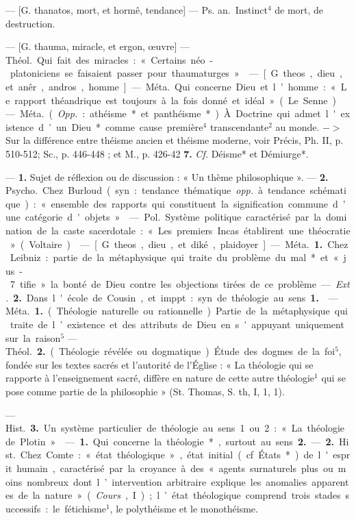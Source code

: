 \begin{itemize}[leftmargin=1cm, label=, itemsep=1pt]
 — [G. thanatos, mort, et
hormê, tendance] — \si{Ps. an.} Instinct$^4$
de mort, de destruction.

 — [G. thauma, miracle, et
ergon, œuvre] — \si{Théol.} Qui fait
des miracles : « Certains néo-platoniciens se faisaient passer pour
thaumaturges. »

 — [G. theos, dieu, et anêr,
andros, homme] — \si{Méta.} Qui concerne Dieu et l’homme : « Le rapport
théandrique est toujours à la fois
donné et idéal » (Le Senne).

 — \si{Méta.} ({\it Opp.} : athéisme* et
panthéisme*). À. Doctrine qui admet
l'existence d’un Dieu* comme cause
première$^4$ transcendante$^2$ au monde.
$->$ Sur la différence entre théisme
ancien et théisme moderne, voir
Précis, Ph. II, p. 510-512; Sc.,
p. 446-448 ; et M., p. 426-42 {\bf 7.} {\it Cf.}
Déisme* et Démiurge*.

 — {\bf 1.} Sujet de réflexion ou de
discussion : « Un thème philosophique ». — {\bf 2.} \si{Psycho.} Chez Burloud (syn. : tendance thématique {\it opp.}
à tendance schématique) : « ensemble
des rapports qui constituent la signification commune d’une catégorie d'objets. »

 — \si{Pol.} Système politique
caractérisé par la domination de la
caste sacerdotale : « Les premiers
Incas établirent une théocratie »
(Voltaire).

 — [G. theos, dieu, et diké, plaidoyer] — \si{Méta.} {\bf 1.} Chez Leibniz :
partie de la métaphysique qui
traite du problème du mal* et « jus- 7
tifie » la bonté de Dieu contre les
objections tirées de ce problème. —
{\it Ext.} {\bf 2.} Dans l'école de Cousin, et
imppt : syn. de théologie au sens {\bf 1.}

 — \si{Méta.} {\bf 1.} (Théologie naturelle ou rationnelle). Partie de la
métaphysique qui traite de l’existence et des attributs de Dieu en
s'appuyant uniquement sur la
raison$^5$ — \si{Théol.} {\bf 2.} (Théologie révélée ou dogmatique). Étude des
dogmes de la foi$^5$, fondée sur les
textes sacrés et l'autorité de l’Église :
« La théologie qui se rapporte à
l’enseignement sacré, diffère en nature de cette autre théologie$^1$ qui
se pose comme partie de la philosophie » (St. Thomas, S. th, I, 1, 1).

— \si{Hist.} {\bf 3.} Un système particulier de théologie au sens 1 ou 2 : « La
théologie de Plotin. »

 — {\bf 1.} Qui concerne la
théologie*, surtout au sens {\bf 2.} —
 {\bf 2.} \si{Hist.} Chez Comte : « état théologique », état initial (cf. États*) de
l'esprit humain, caractérisé par la
croyance à des « agents surnaturels
plus ou moins nombreux dont l’intervention arbitraire explique les
anomalies apparentes de la nature »
({\it Cours}, I) ; l’état théologique comprend trois stades successifs : le
fétichisme$^1$, le polythéisme et le monothéisme.


\end{itemize}
